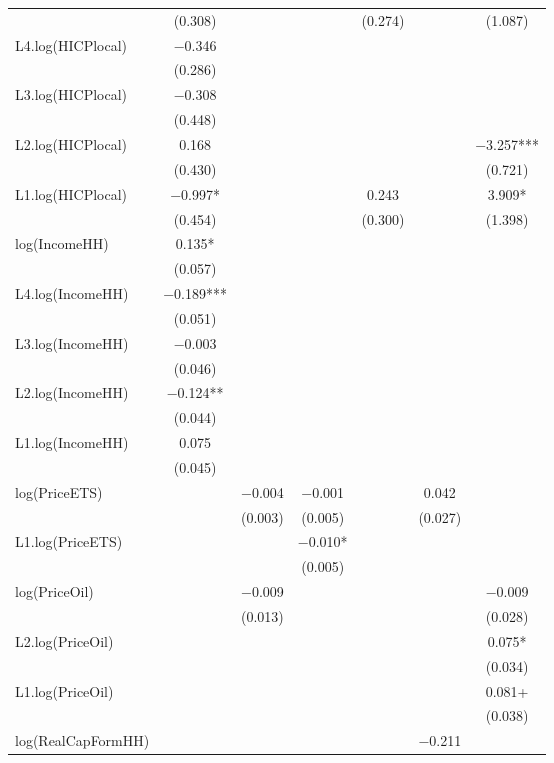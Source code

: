 \begin{table}
{\begin{tabular}[t]{lcccccc}
 & (\num{0.308}) &  &  & (\num{0.274}) &  & (\num{1.087})\\
L4.log(HICPlocal) & \num{-0.346} &  &  &  &  & \\
 & (\num{0.286}) &  &  &  &  & \\
L3.log(HICPlocal) & \num{-0.308} &  &  &  &  & \\
 & (\num{0.448}) &  &  &  &  & \\
L2.log(HICPlocal) & \num{0.168} &  &  &  &  & \num{-3.257}***\\
 & (\num{0.430}) &  &  &  &  & (\num{0.721})\\
L1.log(HICPlocal) & \num{-0.997}* &  &  & \num{0.243} &  & \num{3.909}*\\
 & (\num{0.454}) &  &  & (\num{0.300}) &  & (\num{1.398})\\
log(IncomeHH) & \num{0.135}* &  &  &  &  & \\
 & (\num{0.057}) &  &  &  &  & \\
L4.log(IncomeHH) & \num{-0.189}*** &  &  &  &  & \\
 & (\num{0.051}) &  &  &  &  & \\
L3.log(IncomeHH) & \num{-0.003} &  &  &  &  & \\
 & (\num{0.046}) &  &  &  &  & \\
L2.log(IncomeHH) & \num{-0.124}** &  &  &  &  & \\
 & (\num{0.044}) &  &  &  &  & \\
L1.log(IncomeHH) & \num{0.075} &  &  &  &  & \\
 & (\num{0.045}) &  &  &  &  & \\
log(PriceETS) &  & \num{-0.004} & \num{-0.001} &  & \num{0.042} & \\
 &  & (\num{0.003}) & (\num{0.005}) &  & (\num{0.027}) & \\
L1.log(PriceETS) &  &  & \num{-0.010}* &  &  & \\
 &  &  & (\num{0.005}) &  &  & \\
log(PriceOil) &  & \num{-0.009} &  &  &  & \num{-0.009}\\
 &  & (\num{0.013}) &  &  &  & (\num{0.028})\\
L2.log(PriceOil) &  &  &  &  &  & \num{0.075}*\\
 &  &  &  &  &  & (\num{0.034})\\
L1.log(PriceOil) &  &  &  &  &  & \num{0.081}+\\
 &  &  &  &  &  & (\num{0.038})\\
log(RealCapFormHH) &  &  &  &  & \num{-0.211} & \\

\end{tabular}}
\end{table}
